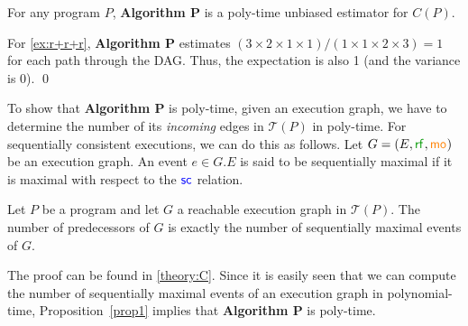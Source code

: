 \documentclass[acmsmall]{acmart}
\newcommand{\rf}[1]{{\textcolor{green!60!black}{\mathsf{rf}}_{#1}}}
\newcommand{\mo}[1]{{\textcolor{orange}{\mathsf{mo}}_{#1}}}
\newcommand{\seqcon}[1]{{\textcolor{blue}{\mathsf{sc}}_{#1}}}
\begin{document}
\begin{proposition}
For any program $P$, \textbf{Algorithm P} is a poly-time unbiased estimator for $C(P)$.
\end{proposition}


\begin{tcolorbox}[
    colback=SkyBlue!5,
    colframe=blue!20,
    boxrule=1pt,
    arc=2pt,
    width=\textwidth,
    breakable
]
\begin{example}
For \cref{ex:r+r+r}, \textbf{Algorithm P} estimates $(3\times 2\times 1 \times 1)/(1\times 1 \times 2\times 3) = 1$ for each path through the DAG.
Thus, the expectation is also 1 (and the variance is 0).
\qed
\end{example}
\end{tcolorbox}

To show that \textbf{Algorithm P} is poly-time, given an execution graph, we have to determine the number of its \emph{incoming} edges in $\mathcal{T}(P)$ in poly-time.
For sequentially consistent executions, we can do this as follows.
Let $G=(E,\rf{},\mo{})$ be an execution graph.
An event $e\in G.E$ is said to be sequentially maximal if it is maximal with respect to the $\seqcon{}$ relation. 

\begin{proposition}
\label{prop1}
Let $P$ be a program and let $G$ a reachable execution graph in $\mathcal{T}(P)$. 
The number of predecessors of $G$ is exactly the number of sequentially maximal events of $G$. 
\end{proposition}

The proof can be found in \cref{theory:C}.
Since it is easily seen that we can compute the number of sequentially maximal events of an execution graph in polynomial-time,
Proposition~\ref{prop1} implies that \textbf{Algorithm P} is poly-time.

\end{document}

